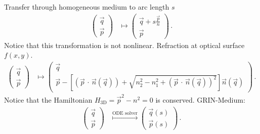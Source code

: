 \documentclass[12pt,a4paper,twoside,openright,BCOR10mm,headsepline,titlepage,abstracton,chapterprefix,final]{scrreprt}
\newcommand{\scpm}[2]{(#1\,\cdot\,#2)}
\begin{document}
Transfer through homogeneous medium to arc length $s$
\begin{align}
 \begin{pmatrix}
  \vec{q} \\
  \vec{p}
 \end{pmatrix} &\mapsto
 \begin{pmatrix}
  \vec{q} + s \frac{\vec{p}}{n} \\
  \vec{p}
 \end{pmatrix}\,.
\end{align}
Notice that this transformation is not nonlinear.
Refraction at optical surface $f(x,y)$.
\begin{align}
 \begin{pmatrix}
  \vec{q} \\
  \vec{p}
 \end{pmatrix} &\mapsto
 \begin{pmatrix}
  \vec{q} \\
  \vec{p} - \left[\scpm{\vec{p}}{\vec{n}(\vec{q})} + \sqrt{n_2^2 - n_1^2 + \scpm{\vec{p}}{\vec{n}(\vec{q})}^2}\right] \vec{n}(\vec{q})
 \end{pmatrix}\,.
\end{align}
Notice that the Hamiltonian $H_\text{3D} = \vec{p}^2 - n^2 = 0$ is conserved.
GRIN-Medium:
\begin{align}
 \begin{pmatrix}
  \vec{q} \\
  \vec{p}
 \end{pmatrix} &\stackrel{\text{ODE solver}}{\mapsto}
 \begin{pmatrix}
  \vec{q}(s) \\
  \vec{p}(s)
 \end{pmatrix}\,.
\end{align}
\end{document}
